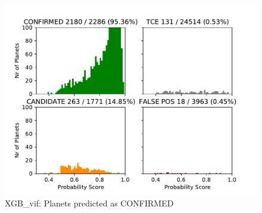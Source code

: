 
\begin{figure}[H]
                \centering
                \includegraphics[width = 1\textwidth,height=.4\textheight]{data/XGB_vif_pred_confirm.pdf}
                \caption{XGB_vif: Planets predicted as CONFIRMED}
                \label{fig:data/XGB_vif_pred_confirm}
                \end{figure}